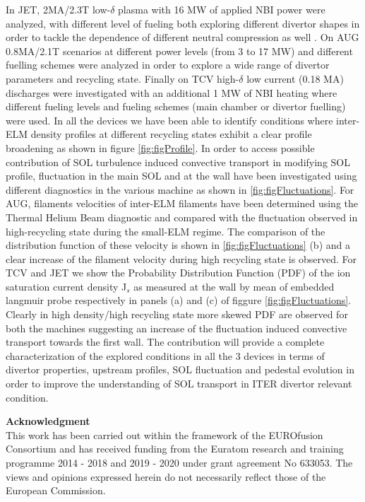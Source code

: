 \documentclass[12pt, a4paper, twoside]{article}
\begin{document}
In JET, 2MA/2.3T low-$\delta$ plasma with 16 MW of
applied NBI power were analyzed, with different level of fueling both
exploring different divertor shapes
in order to tackle the dependence of different neutral compression as well
\cite{Tamain:2015cx}.
On AUG 0.8MA/2.1T scenarios at different power levels (from 3 to 17 MW) and different fuelling
schemes were analyzed in order to explore a wide range of divertor
parameters and recycling state.
Finally on TCV high-$\delta$ low current (0.18 MA)
discharges were investigated with an additional 1 MW of NBI heating
where different fueling levels and fueling schemes (main chamber or
divertor fuelling) were used. In all the devices we have been able to
identify conditions where inter-ELM density profiles at different recycling states exhibit a clear profile broadening as shown in
figure \ref{fig:figProfile}. In order to access possible contribution of SOL
turbulence induced convective transport in modifying SOL profile,
fluctuation in the main SOL and at the wall have been investigated
using different diagnostics in the various machine as shown in
\ref{fig:figFluctuations}. For AUG,  filaments velocities of
inter-ELM filaments have been determined using the Thermal Helium Beam
diagnostic \cite{Griener:20183cf} and compared with the fluctuation
observed in high-recycling state during the small-ELM regime. The
comparison of the distribution function of these velocity is shown in
\ref{fig:figFluctuations} (b) and a clear increase of the filament velocity
during high recycling state is observed. For TCV and JET we show the
Probability Distribution Function (PDF) of the ion saturation current
density J$_s$ as measured at the wall by mean of embedded langmuir
probe respectively in panels (a) and (c) of figgure
\ref{fig:figFluctuations}.
Clearly in high density/high recycling state more skewed PDF are
observed for both the machines suggesting an increase of the
fluctuation induced convective transport towards the first wall.
The contribution will provide a complete characterization of the
explored conditions in all the 3 devices in terms of divertor properties, upstream
profiles, SOL fluctuation and pedestal evolution in order to improve
the understanding of SOL transport in ITER divertor relevant
condition.

\begingroup
{}
{\footnotesize\textbf{Acknowledgment}\\
This work has been carried out within the framework of the EUROfusion Consortium and has received funding from the Euratom research and training programme 2014 - 2018 and 2019 - 2020 under grant agreement No 633053. The views and opinions expressed herein do not necessarily reflect those of the European Commission.}
\begin{multicols}{2}
\setlength\bibitemsep{0pt}
\printbibliography[heading=none]
\end{multicols}
\endgroup
\end{document}
